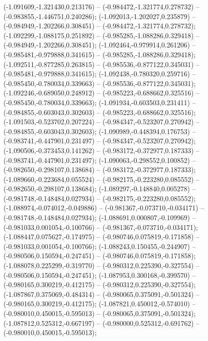  (-1.091609,-1.321430,0.213176) -- (-0.984472,-1.321774,0.278732) -- (-0.983855,-1.446751,0.240286);
 (-1.092013,-1.202027,0.235879) -- (-0.984949,-1.202266,0.308451) -- (-0.984472,-1.321774,0.278732);
 (-1.092299,-1.088175,0.251892) -- (-0.985285,-1.088286,0.329418) -- (-0.984949,-1.202266,0.308451);
 (-1.092464,-0.979914,0.261206) -- (-0.985481,-0.979888,0.341615) -- (-0.985285,-1.088286,0.329418);
 (-1.092511,-0.877285,0.263815) -- (-0.985536,-0.877122,0.345031) -- (-0.985481,-0.979888,0.341615);
 (-1.092438,-0.780320,0.259716) -- (-0.985450,-0.780034,0.339663) -- (-0.985536,-0.877122,0.345031);
 (-1.092246,-0.689050,0.248912) -- (-0.985223,-0.688662,0.325516) -- (-0.985450,-0.780034,0.339663);
 (-1.091934,-0.603503,0.231411) -- (-0.984855,-0.603043,0.302603) -- (-0.985223,-0.688662,0.325516);
 (-1.091503,-0.523702,0.207224) -- (-0.984347,-0.523207,0.270942) -- (-0.984855,-0.603043,0.302603);
 (-1.090989,-0.448394,0.176753) -- (-0.983741,-0.447901,0.231497) -- (-0.984347,-0.523207,0.270942);
 (-1.090506,-0.373453,0.141262) -- (-0.983172,-0.372977,0.187333) -- (-0.983741,-0.447901,0.231497);
 (-1.090063,-0.298552,0.100852) -- (-0.982650,-0.298107,0.138684) -- (-0.983172,-0.372977,0.187333);
 (-1.089660,-0.223684,0.055524) -- (-0.982175,-0.223280,0.085552) -- (-0.982650,-0.298107,0.138684);
 (-1.089297,-0.148840,0.005278) -- (-0.981748,-0.148484,0.027934) -- (-0.982175,-0.223280,0.085552);
 (-1.088974,-0.074012,-0.049886) -- (-0.981367,-0.073710,-0.034171) -- (-0.981748,-0.148484,0.027934);
 (-1.088691,0.000807,-0.109969) -- (-0.981033,0.001054,-0.100766) -- (-0.981367,-0.073710,-0.034171);
 (-1.088447,0.075627,-0.174975) -- (-0.980746,0.075819,-0.171858) -- (-0.981033,0.001054,-0.100766);
 (-1.088243,0.150455,-0.244907) -- (-0.980506,0.150594,-0.247451) -- (-0.980746,0.075819,-0.171858);
 (-1.088078,0.225299,-0.319770) -- (-0.980312,0.225390,-0.327554) -- (-0.980506,0.150594,-0.247451);
 (-1.087953,0.300168,-0.399570) -- (-0.980165,0.300219,-0.412175) -- (-0.980312,0.225390,-0.327554);
 (-1.087867,0.375069,-0.484314) -- (-0.980065,0.375091,-0.501324) -- (-0.980165,0.300219,-0.412175);
 (-1.087821,0.450012,-0.574010) -- (-0.980010,0.450015,-0.595013) -- (-0.980065,0.375091,-0.501324);
 (-1.087812,0.525312,-0.667197) -- (-0.980000,0.525312,-0.691762) -- (-0.980010,0.450015,-0.595013);
